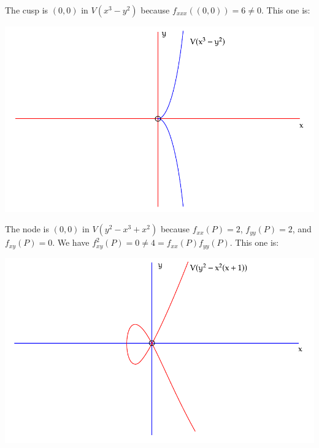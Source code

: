 \documentclass{article}
\begin{document}
\begin{answer}
    The cusp is $(0, 0)$ in $V(x^{3} - y^{2})$ because $f_{xxx}((0, 0)) = 6 \neq 0$. This one is:
        \begin{center}
            \includegraphics{cusp}
        \end{center}

    The node is $(0, 0)$ in $V(y^{2} - x^{3} + x^{2})$ because $f_{xx}(P) = 2$, $f_{yy}(P) = 2$, and $f_{xy}(P) = 0$. We have $f_{xy}^{2}(P) = 0 \neq 4 = f_{xx}(P)f_{yy}(P)$. This one is:
        \begin{center}
            \includegraphics{node}
        \end{center}
\end{answer}
\end{document}
